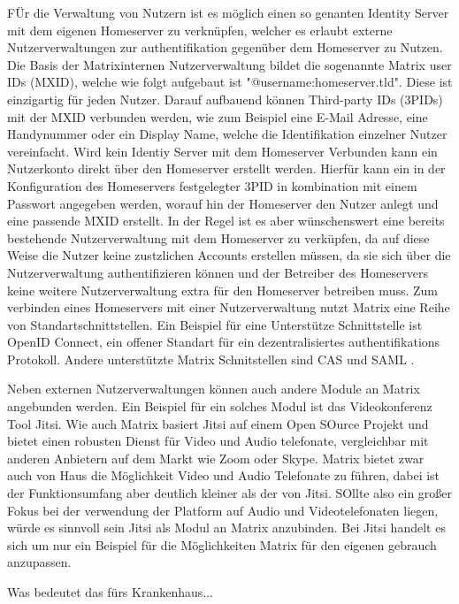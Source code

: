 FÜr die Verwaltung von Nutzern ist es möglich einen so genanten Identity Server mit dem eigenen Homeserver zu verknüpfen, welcher es erlaubt externe Nutzerverwaltungen zur authentifikation gegenüber dem Homeserver zu Nutzen. Die Basis der Matrixinternen Nutzerverwaltung bildet die sogenannte Matrix user IDs (MXID), welche wie folgt aufgebaut ist "@username:homeserver.tld". Diese ist einzigartig für jeden Nutzer. Darauf aufbauend können Third-party IDs (3PIDs) mit der MXID verbunden werden, wie zum Beispiel eine E-Mail Adresse, eine Handynummer oder ein Display Name, welche die Identifikation einzelner Nutzer vereinfacht. Wird kein Identiy Server mit dem Homeserver Verbunden kann ein Nutzerkonto direkt über den Homeserver erstellt werden. Hierfür kann ein in der Konfiguration des Homeservers festgelegter 3PID in kombination mit einem Passwort angegeben werden, worauf hin der Homeserver den Nutzer anlegt und eine passende MXID erstellt. In der Regel ist es aber wünschenswert eine bereits bestehende Nutzerverwaltung mit dem Homeserver zu verküpfen, da auf diese Weise die Nutzer keine zustzlichen Accounts erstellen müssen, da sie sich über die Nutzerverwaltung authentifizieren können und der Betreiber des Homeservers keine weitere Nutzerverwaltung extra für den Homeserver betreiben muss. Zum verbinden eines Homeservers mit einer Nutzerverwaltung nutzt Matrix eine Reihe von Standartschnittstellen. Ein Beispiel für eine Unterstütze Schnittstelle ist OpenID Connect, ein offener Standart für ein dezentralisiertes authentifikations Protokoll. Andere unterstützte Matrix Schnitstellen sind CAS und SAML .

Neben externen Nutzerverwaltungen können auch andere Module an Matrix angebunden werden. Ein Beispiel für ein solches Modul ist das Videokonferenz Tool Jitsi. Wie auch Matrix basiert Jitsi auf einem Open SOurce Projekt und bietet einen robusten Dienst für Video und Audio telefonate, vergleichbar mit anderen Anbietern auf dem Markt wie Zoom oder Skype. Matrix bietet zwar auch von Haus die Möglichkeit Video und Audio Telefonate zu führen, dabei ist der Funktionsumfang aber deutlich kleiner als der von Jitsi. SOllte also ein großer Fokus bei der verwendung der Platform auf Audio und Videotelefonaten liegen, würde es sinnvoll sein Jitsi als Modul an Matrix anzubinden. Bei Jitsi handelt es sich um nur ein Beispiel für die Möglichkeiten Matrix für den eigenen gebrauch anzupassen.  

Was bedeutet das fürs Krankenhaus...

